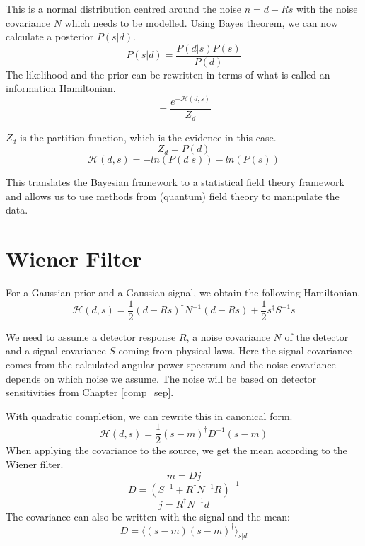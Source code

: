 This is a normal distribution centred around the noise $n=d-Rs$ with the noise covariance $N$ which needs to be modelled. Using Bayes theorem, we can now calculate a posterior $P(s|d)$. 
\begin{equation}
    P(s|d) = \frac{P(d|s)P(s)}{P(d)}
\end{equation}
The likelihood and the prior can be rewritten in terms of what is called an information Hamiltonian.
\begin{equation}
    = \frac{e^{-\mathcal{H}(d, s)}}{Z_d}
\end{equation}

$Z_d$ is the partition function, which is the evidence in this case.
\begin{equation}
    Z_d = P(d)
\end{equation}
\begin{equation}
        \mathcal{H}(d, s) = -ln(P(d|s)) - ln(P(s))
\end{equation}

This translates the Bayesian framework to a statistical field theory framework and allows us to use methods from (quantum) field theory to manipulate the data.

\section{Wiener Filter}
For a Gaussian prior and a Gaussian signal, we obtain the following
Hamiltonian.
\begin{equation}
    \mathcal{H}(d, s) = \frac{1}{2}(d-Rs)^{\dagger}N^{-1}(d-Rs)+\frac{1}{2}s^{\dagger}S^{-1}s
\end{equation}

We need to assume a detector response $R$, a noise covariance $N$ of the detector and a signal covariance $S$ coming from physical laws. Here the signal covariance comes from the calculated angular power spectrum and the noise covariance depends on which noise we assume. The noise will be based on detector sensitivities from Chapter \ref{comp_sep}.

With quadratic completion, we can rewrite this in canonical form.
\begin{equation}
    \mathcal{H}(d, s) = \frac{1}{2}(s-m)^\dagger D^{-1}(s-m)
\end{equation}
When applying the covariance to the source, we get the mean according to the Wiener filter.
\begin{equation}
    m = Dj
\end{equation}
\begin{equation}
    D =(S^{-1}+R^{\dagger}N^{-1}R)^{-1}
\end{equation}
\begin{equation}
    j =R^{\dagger}N^{-1}d
\end{equation}
The covariance can also be written with the signal and the mean:
\begin{equation}
    D=\langle (s-m)(s-m)^\dagger \rangle_{s|d}
\end{equation}

